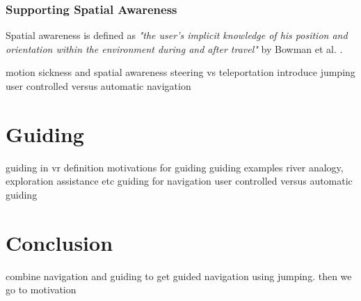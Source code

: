 \subsubsection{Supporting Spatial Awareness}
\label{subsubsection RW Navigation NC: Supporting Spatial Awareness}
Spatial awareness is defined as \textit{"the user’s implicit knowledge of his position and orientation within the environment during and after travel"} by Bowman et al. \cite{Bowman1997}.

motion sickness and spatial awareness
steering vs teleportation
introduce jumping 
user controlled versus automatic navigation


\section{Guiding}
\label{section:RW Guiding}
guiding in vr definition
motivations for guiding
guiding examples
river analogy, exploration assistance etc
guiding for navigation
user controlled versus automatic guiding

\section{Conclusion}
\label{section:RW Conclusion}
combine navigation and guiding to get guided navigation using jumping. then we go to motivation